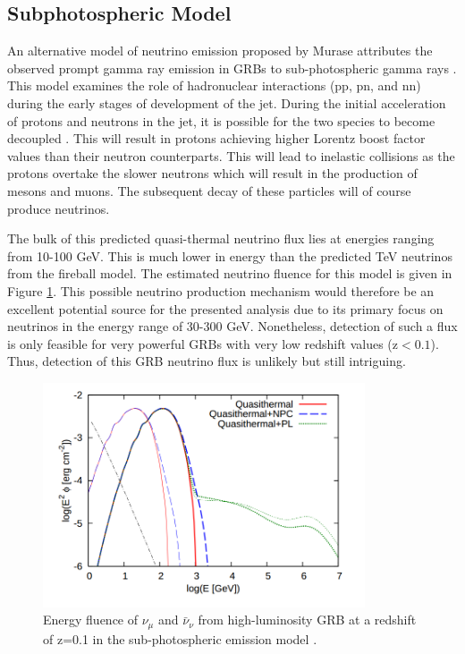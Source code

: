 \documentclass{gatech-thesis}
\begin{document}
\subsection{Subphotospheric Model}
An alternative model of neutrino emission proposed by Murase attributes the observed prompt gamma ray emission in GRBs to sub-photospheric gamma rays \cite{2013PhRvL.111m1102M}. This model examines the role of hadronuclear interactions (pp, pn, and nn) during the early stages of development of the jet. During the initial acceleration of protons and neutrons in the jet, it is possible for the two species to become decoupled \cite{PhysRevLett.85.1362}. This will result in protons achieving higher Lorentz boost factor values than their neutron counterparts. This will lead to inelastic collisions as the protons overtake the slower neutrons which will result in the production of mesons and muons. The subsequent decay of these particles will of course produce neutrinos.

The bulk of this predicted quasi-thermal neutrino flux lies at energies ranging from 10-100 GeV. This is much lower in energy than the predicted TeV neutrinos from the fireball model. The estimated neutrino fluence for this model is given in Figure \ref{fig:subphotospheric_nus}. This possible neutrino production mechanism would therefore be an excellent potential source for the presented analysis due to its primary focus on neutrinos in the energy range of 30-300 GeV. Nonetheless, detection of such a flux is only feasible for very powerful GRBs with very low redshift values (z$<0.1$). Thus, detection of this GRB neutrino flux is unlikely but still intriguing.

\begin{figure}[ht]
  \begin{center}
    \includegraphics[width=0.85\textwidth,keepaspectratio]{SubPhotoFluence.png}
  \end{center}
  \caption[GRB Neutrino Fluence under Sub-photospheric Model]{Energy fluence of $\nu_{\mu}$ and $\bar{\nu}_{\nu}$ from high-luminosity GRB at a redshift of z=0.1 in the sub-photospheric emission model \cite{2013PhRvL.111m1102M}.}
  \label{fig:subphotospheric_nus}
\end{figure}
\end{document}
